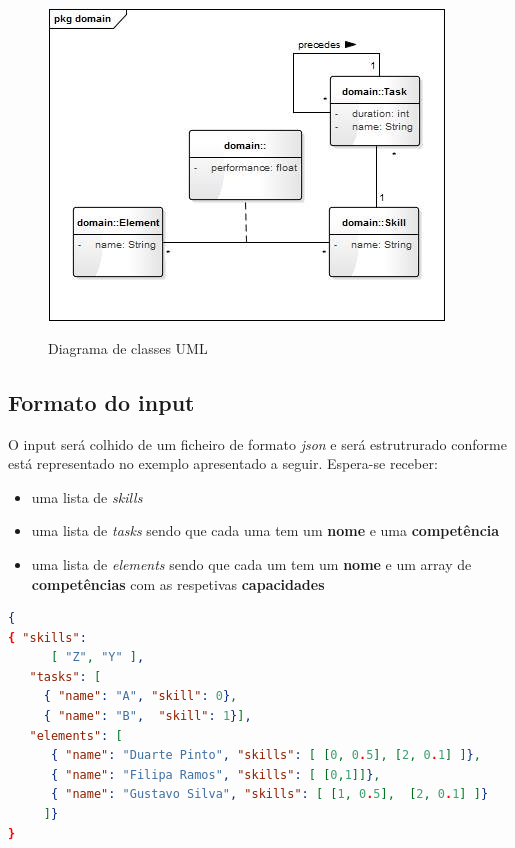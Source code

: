 \begin{titlepage}
\begin{figure}[h!]
  \centering
    \includegraphics[width=10.5cm, height = 9cm]{uml.jpg}
  \caption{Diagrama de classes UML}
  \label{uml}
\end{figure}

\newpage

\subsection{Formato do input}

O input será colhido de um ficheiro de formato \textit{json} e será estrutrurado conforme está representado no exemplo apresentado a seguir. Espera-se receber:

\begin{itemize}
 	\item uma lista de \textit{skills}
	\item uma lista de \textit{tasks} sendo que cada uma tem um \textbf{nome} e uma \textbf{competência}
	\item uma lista de \textit{elements} sendo que cada um tem um \textbf{nome} e um array de \textbf{competências} com as respetivas \textbf{capacidades}
\end{itemize}

\begin{lstlisting}[language=json,firstnumber=1]
{ 
{ "skills": 
      [ "Z", "Y" ], 
   "tasks": [
     { "name": "A", "skill": 0},
     { "name": "B",  "skill": 1}],
   "elements": [
      { "name": "Duarte Pinto", "skills": [ [0, 0.5], [2, 0.1] ]},
      { "name": "Filipa Ramos", "skills": [ [0,1]]},
      { "name": "Gustavo Silva", "skills": [ [1, 0.5],  [2, 0.1] ]}
     ]}
}
\end{lstlisting}


\end{titlepage}
